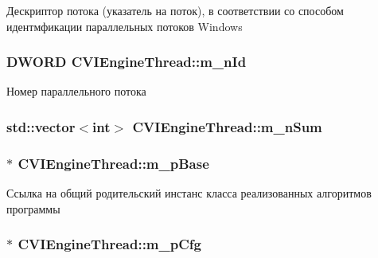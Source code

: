 Дескриптор потока (указатель на поток), в соответствии со способом идентмфикации параллельных потоков Windows 

\hypertarget{class_c_v_i_engine_thread_a9cc3627d5a28cc22d6e33cdb052a7f4d}{
\subsubsection[{m\+\_\+n\+Id}]{\setlength{\rightskip}{0pt plus 5cm}D\+W\+O\+R\+D C\+V\+I\+Engine\+Thread\+::m\+\_\+n\+Id}}\label{class_c_v_i_engine_thread_a9cc3627d5a28cc22d6e33cdb052a7f4d}


Номер параллельного потока 

\hypertarget{class_c_v_i_engine_thread_a8b580461aa6df1676e9e31b2a46bcc7e}{
\subsubsection[{m\+\_\+n\+Sum}]{\setlength{\rightskip}{0pt plus 5cm}std\+::vector$<$int$>$ C\+V\+I\+Engine\+Thread\+::m\+\_\+n\+Sum}}\label{class_c_v_i_engine_thread_a8b580461aa6df1676e9e31b2a46bcc7e}




\hypertarget{class_c_v_i_engine_thread_a771ad7767cb35813f6671f497b075496}{
\subsubsection[{m\+\_\+p\+Base}]{$\ast$ C\+V\+I\+Engine\+Thread\+::m\+\_\+p\+Base}}\label{class_c_v_i_engine_thread_a771ad7767cb35813f6671f497b075496}


Ссылка на общий родительский инстанс класса реализованных алгоритмов программы 

\hypertarget{class_c_v_i_engine_thread_ac297ce260db221d74422e3c7e8e03e27}{
\subsubsection[{m\+\_\+p\+Cfg}]{$\ast$ C\+V\+I\+Engine\+Thread\+::m\+\_\+p\+Cfg}}\label{class_c_v_i_engine_thread_ac297ce260db221d74422e3c7e8e03e27}


